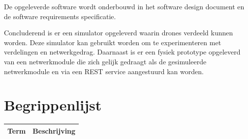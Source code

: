 \documentclass[a4paper, 11pt, oneside]{report}
\begin{document}
De opgeleverde software wordt onderbouwd in het software design document en de software requirements specificatie.

Concluderend is er een simulator opgeleverd waarin drones verdeeld kunnen worden.
Deze simulator kan gebruikt worden om te experimenteren met verdelingen en netwerkgedrag.
Daarnaast is er een fysiek prototype opgeleverd van een netwerkmodule die zich gelijk gedraagt als de gesimuleerde netwerkmodule en via een REST service aangestuurd kan worden.   

\tableofcontents
\clearpage
\chapter*{Begrippenlijst}
\label{inleiding:begrippenlijst}

\begin{longtable}[c]{|l|l|}
	\hline
	\rowcolor[HTML]{9B9B9B} 
	Term & Beschrijving \\ \hline
	\endhead


\end{longtable}
\end{document}
